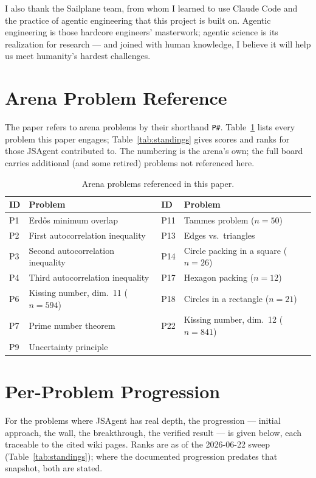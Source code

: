\documentclass[11pt]{article}
\begin{document}
I also thank the Sailplane team, from whom I learned to use Claude Code and the practice of
agentic engineering that this project is built on. Agentic engineering is those hardcore
engineers' masterwork; agentic science is its realization for research --- and joined with human
knowledge, I believe it will help us meet humanity's hardest challenges.

\appendix
\section{Arena Problem Reference}
\label{app:problems}
The paper refers to arena problems by their shorthand \texttt{P\#}. Table~\ref{tab:problems}
lists every problem this paper engages; Table~\ref{tab:standings} gives scores and ranks for
those JSAgent contributed to. The numbering is the arena's own; the full board carries
additional (and some retired) problems not referenced here.

\begin{table}[htbp]
\centering\small
\caption{Arena problems referenced in this paper.}
\label{tab:problems}
\begin{tabular}{ll@{\qquad}ll}
\toprule
ID & Problem & ID & Problem \\
\midrule
P1  & Erd\H{o}s minimum overlap          & P11 & Tammes problem ($n{=}50$) \\
P2  & First autocorrelation inequality   & P13 & Edges vs.\ triangles \\
P3  & Second autocorrelation inequality  & P14 & Circle packing in a square ($n{=}26$) \\
P4  & Third autocorrelation inequality   & P17 & Hexagon packing ($n{=}12$) \\
P6  & Kissing number, dim.\ 11 ($n{=}594$) & P18 & Circles in a rectangle ($n{=}21$) \\
P7  & Prime number theorem               & P22 & Kissing number, dim.\ 12 ($n{=}841$) \\
P9  & Uncertainty principle              &     & \\
\bottomrule
\end{tabular}
\end{table}

\section{Per-Problem Progression}
\label{app:progression}
For the problems where JSAgent has real depth, the progression --- initial approach, the wall,
the breakthrough, the verified result --- is given below, each traceable to the cited wiki
pages. Ranks are as of the 2026-06-22 sweep (Table~\ref{tab:standings}); where the documented
progression predates that snapshot, both are stated.
\end{document}
